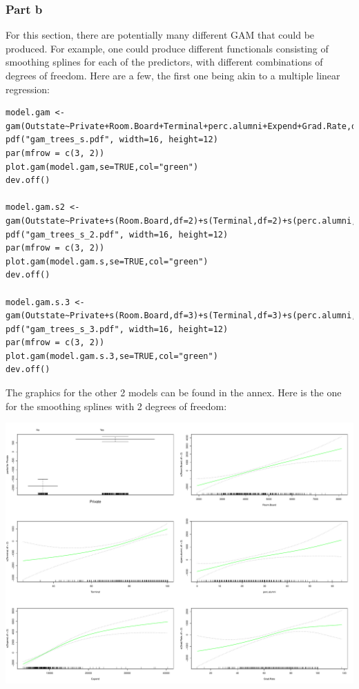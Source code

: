 \documentclass[11pt, a4paper]{article}
\begin{document}
\subsubsection{Part b}
\label{sec-1-1-2}

For this section, there are potentially many different GAM that could
be produced. For example, one could produce different functionals
consisting of smoothing splines for each of the predictors, with
different combinations of degrees of freedom. Here are a few, the
first one being akin to a multiple linear regression:


\begin{verbatim}
model.gam <- gam(Outstate~Private+Room.Board+Terminal+perc.alumni+Expend+Grad.Rate,data=College[train,])
pdf("gam_trees_s.pdf", width=16, height=12)
par(mfrow = c(3, 2))
plot.gam(model.gam,se=TRUE,col="green")
dev.off()

model.gam.s2 <- gam(Outstate~Private+s(Room.Board,df=2)+s(Terminal,df=2)+s(perc.alumni,df=2)+s(Expend,df=2)+s(Grad.Rate,df=2),data=College[train,])
pdf("gam_trees_s_2.pdf", width=16, height=12)
par(mfrow = c(3, 2))
plot.gam(model.gam.s,se=TRUE,col="green")
dev.off()

model.gam.s.3 <- gam(Outstate~Private+s(Room.Board,df=3)+s(Terminal,df=3)+s(perc.alumni,df=3)+s(Expend,df=3)+s(Grad.Rate,df=3),data=College[train,])
pdf("gam_trees_s_3.pdf", width=16, height=12)
par(mfrow = c(3, 2))
plot.gam(model.gam.s.3,se=TRUE,col="green")
dev.off()
\end{verbatim}

The graphics for the other 2 models can be found in the annex. Here
is the one for the smoothing splines with 2 degrees of freedom: 

\includegraphics[scale=0.45]{gam_trees_s_2.pdf}
\end{document}
